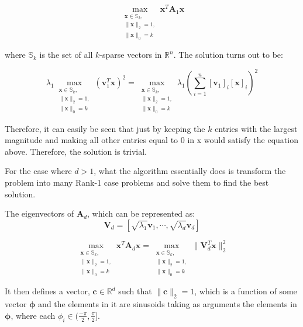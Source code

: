 \documentclass[11pt,a4paper]{article}
\begin{document}
\begin{equation*}
\max_{\substack{\mathbf{x} \in\mathbb{S}_k, \\ \|\mathbf{x}\|_2 = 1, \\ \|\mathbf{x}\|_0 = k}} \mathbf{x}^T\mathbf{A}_1\mathbf{x}
\end{equation*}

where $\mathbb{S}_k$ is the set of all $k$-sparse vectors in $\mathbb{R}^n$. The solution turns out to be:

\begin{equation*}
\lambda_1\max_{\substack{\mathbf{x} \in\mathbb{S}_k, \\ \|\mathbf{x}\|_2 = 1, \\ \|\mathbf{x}\|_0 = k}} \left(\mathbf{v}_1^T \mathbf{x}\right)^2 = \max_{\substack{\mathbf{x} \in\mathbb{S}_k, \\ \|\mathbf{x}\|_2 = 1, \\ \|\mathbf{x}\|_0 = k}} \lambda_1\left( \sum_{i = 1}^n [\mathbf{v}_{1}]_i [\mathbf{x}]_i\right)^2
\end{equation*}

Therefore, it can easily be seen that just by keeping the $k$ entries with the largest magnitude and making all other entries equal to 0 in x would satisfy the equation above. Therefore, the solution is trivial. 

For the case where $d > 1$, what the algorithm essentially does is transform the problem into many Rank-1 case problems and solve them to find the best solution.

The eigenvectors of $\mathbf{A}_d$, which can be represented as:
\begin{equation*}
\mathbf{V}_d = [\sqrt{\lambda_1}\mathbf{v}_1, \cdots, \sqrt{\lambda_d}\mathbf{v}_d]
\end{equation*}

\begin{equation*}
\max_{\substack{\mathbf{x} \in\mathbb{S}_k, \\ \|\mathbf{x}\|_2 = 1, \\ \|\mathbf{x}\|_0 = k}}  \mathbf{x}^T\mathbf{A}_d\mathbf{x} = \max_{\substack{\mathbf{x} \in\mathbb{S}_k, \\ \|\mathbf{x}\|_2 = 1, \\ \|\mathbf{x}\|_0 = k}} \|\mathbf{V}_d^T\mathbf{x}\|_2^2
\end{equation*}


It then defines a vector, $\mathbf{c} \in \mathbb{R}^d$ such that $\|\mathbf{c}\|_2=1$, which is a function of some vector $\mathbf{\phi}$ and the elements in it are sinusoids taking as arguments the elements in $\mathbf{\phi}$, where each $\phi_i \in (\frac{-\pi}{2}, \frac{\pi}{2}]$.
\end{document}
